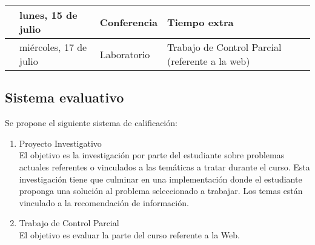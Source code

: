 \documentclass[11pt]{article}
\begin{document}
\begin{longtable}{|>{\centering\arraybackslash}p{1.5cm}|p{3.7cm}|p{2.2cm}|p{6cm}|}
		12 & lunes, 15 de julio  & Conferencia & Tiempo extra  \\
		\cline{2-4}
		& miércoles, 17 de julio  & Laboratorio & Trabajo de Control Parcial (referente a la web) \\
		\hline
	\end{longtable}
	
	
	\vspace{2mm}
	
	\subsection*{Sistema evaluativo}
	
	Se propone el siguiente sistema de calificación:
	
	\begin{enumerate}
		\item Proyecto Investigativo \\[1mm]
		El objetivo es la investigación por parte del estudiante sobre problemas actuales referentes o vinculados a las temáticas a tratar durante el curso. Esta investigación tiene que culminar en una implementación donde el estudiante proponga una solución al problema seleccionado a trabajar. Los temas están vinculado a la recomendación de información.
		
		\item Trabajo de Control Parcial \\[1mm]
		El objetivo es evaluar la parte del curso referente a la Web.
		
	\end{enumerate}
	
	
	
	
\end{document}
